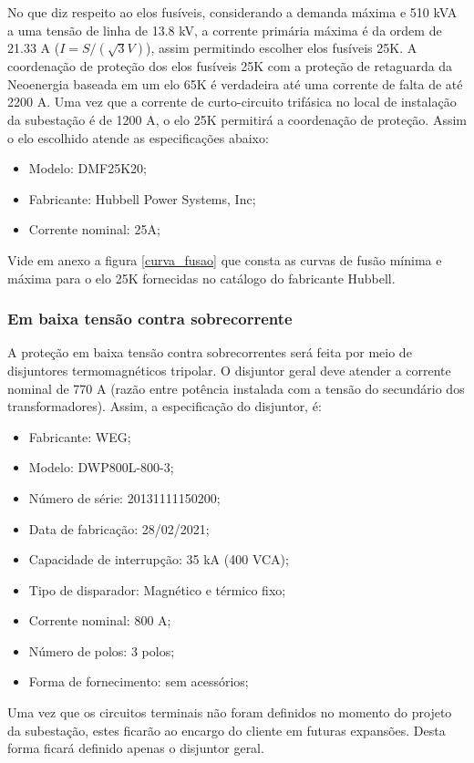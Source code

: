 No que diz respeito ao elos fusíveis, considerando a demanda máxima e 510 kVA a uma tensão de linha de 13.8 kV, a corrente primária máxima é da ordem de 21.33 A ($I=S/(\sqrt{3}V)$), assim permitindo escolher elos fusíveis 25K. A coordenação de proteção dos elos fusíveis 25K com a proteção de retaguarda da Neoenergia baseada em um elo 65K é verdadeira até uma corrente de falta de até 2200 A. Uma vez que a corrente de curto-circuito trifásica no local de instalação da subestação é de 1200 A, o elo 25K permitirá a coordenação de proteção. Assim o elo escolhido atende as especificações abaixo:

\begin{itemize}
    \item Modelo: DMF25K20;
    \item Fabricante: Hubbell Power Systems, Inc;
    \item Corrente nominal: 25A;
\end{itemize}

Vide em anexo a figura \ref{curva_fusao} que consta as curvas de fusão mínima e máxima para o elo 25K fornecidas no catálogo do fabricante Hubbell.

\subsubsection{Em baixa tensão contra sobrecorrente}


A proteção em baixa tensão contra sobrecorrentes será feita por meio de disjuntores termomagnéticos tripolar. O disjuntor geral deve atender a corrente nominal de 770 A (razão entre potência instalada com a tensão do secundário dos transformadores). Assim, a especificação do disjuntor, é:

\begin{itemize}
    \item Fabricante: WEG;
    \item Modelo: DWP800L-800-3;
    \item Número de série: 20131111150200;
    \item Data de fabricação: 28/02/2021;
    \item Capacidade de interrupção: 35 kA (400 VCA);
    \item Tipo de disparador: Magnético e térmico fixo;
    \item Corrente nominal: 800 A;
    \item Número de polos: 3 polos;
    \item Forma de fornecimento: sem acessórios;
\end{itemize}

Uma vez que os circuitos terminais não foram definidos no momento do projeto da subestação, estes ficarão ao encargo do cliente em futuras expansões. Desta forma ficará definido apenas o disjuntor geral.
